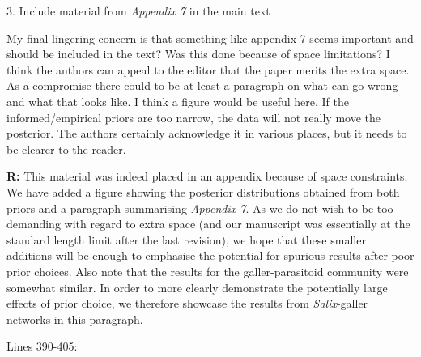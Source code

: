 \documentclass[12pt]{letter}
\newenvironment{refquote}{\bigskip \begin{it}}{\end{it}\smallskip}
\begin{document}
	3. Include material from \emph{Appendix 7} in the main text

		\begin{refquote}
		
			My final lingering concern is that something like appendix 7 seems important and should be included in the text? Was this done because of space limitations? I think the authors can appeal to the editor that the paper merits the extra space. As a compromise there could to be at least a paragraph on what can go wrong and what that looks like. I think a figure would be useful here. If the informed/empirical priors are too narrow, the data will not really move the posterior. The authors certainly acknowledge it in various places, but it needs to be clearer to the reader.

		\end{refquote}


		\textbf{R:} This material was indeed placed in an appendix because of space constraints. We have added a figure showing the posterior distributions obtained from both priors and a paragraph summarising \emph{Appendix 7}. As we do not wish to be too demanding with regard to extra space (and our manuscript was essentially at the standard length limit after the last revision), we hope that these smaller additions will be enough to emphasise the potential for spurious results after poor prior choices. Also note that the results for the galler-parasitoid community were somewhat similar. In order to more clearly demonstrate the potentially large effects of prior choice, we therefore showcase the results from \emph{Salix}-galler networks in this paragraph.


		Lines 390-405:
\end{document}
